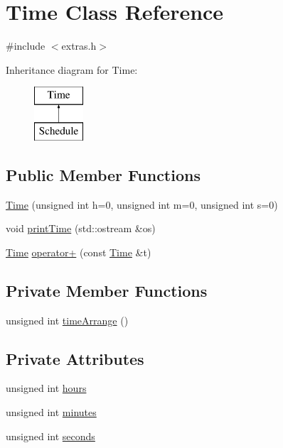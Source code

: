 \hypertarget{classTime}{}\section{Time Class Reference}
\label{classTime}


{\ttfamily \#include $<$extras.\+h$>$}

Inheritance diagram for Time\+:\begin{figure}[H]
\begin{center}
\leavevmode
\includegraphics[height=2.000000cm]{classTime}
\end{center}
\end{figure}
\subsection*{Public Member Functions}
\begin{DoxyCompactItemize}
\item 
\hyperlink{classTime_a538120472036ef2387b72d9b00050898}{Time} (unsigned int h=0, unsigned int m=0, unsigned int s=0)
\item 
void \hyperlink{classTime_a79d96e150ff808580fdf43932897130d}{print\+Time} (std\+::ostream \&os)
\item 
\hyperlink{classTime}{Time} \hyperlink{classTime_affd07723baea79e855d58e12b42a5b8f}{operator+} (const \hyperlink{classTime}{Time} \&t)
\end{DoxyCompactItemize}
\subsection*{Private Member Functions}
\begin{DoxyCompactItemize}
\item 
unsigned int \hyperlink{classTime_a9cbc26fef4650c18e4f0c5ee695c006c}{time\+Arrange} ()
\end{DoxyCompactItemize}
\subsection*{Private Attributes}
\begin{DoxyCompactItemize}
\item 
unsigned int \hyperlink{classTime_a08e7d6202b1fe8c01c25bf6688d41712}{hours}
\item 
unsigned int \hyperlink{classTime_ab9da5c3324d296464bf26131fd5d8c3f}{minutes}
\item 
unsigned int \hyperlink{classTime_ad39274f5d646ddc93addce23f8f71dde}{seconds}
\end{DoxyCompactItemize}


